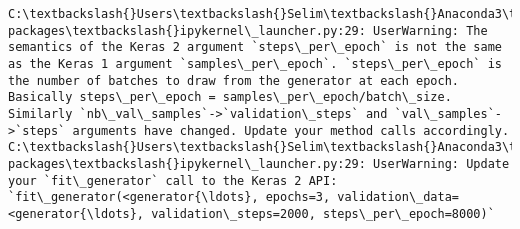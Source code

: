 \documentclass[11pt]{article}
\begin{document}
\begin{Verbatim}[commandchars=\\\{\}]
C:\textbackslash{}Users\textbackslash{}Selim\textbackslash{}Anaconda3\textbackslash{}envs\textbackslash{}tfenv\textbackslash{}lib\textbackslash{}site-packages\textbackslash{}ipykernel\_launcher.py:29: UserWarning: The semantics of the Keras 2 argument `steps\_per\_epoch` is not the same as the Keras 1 argument `samples\_per\_epoch`. `steps\_per\_epoch` is the number of batches to draw from the generator at each epoch. Basically steps\_per\_epoch = samples\_per\_epoch/batch\_size. Similarly `nb\_val\_samples`->`validation\_steps` and `val\_samples`->`steps` arguments have changed. Update your method calls accordingly.
C:\textbackslash{}Users\textbackslash{}Selim\textbackslash{}Anaconda3\textbackslash{}envs\textbackslash{}tfenv\textbackslash{}lib\textbackslash{}site-packages\textbackslash{}ipykernel\_launcher.py:29: UserWarning: Update your `fit\_generator` call to the Keras 2 API: `fit\_generator(<generator{\ldots}, epochs=3, validation\_data=<generator{\ldots}, validation\_steps=2000, steps\_per\_epoch=8000)`

    \end{Verbatim}
\end{document}
